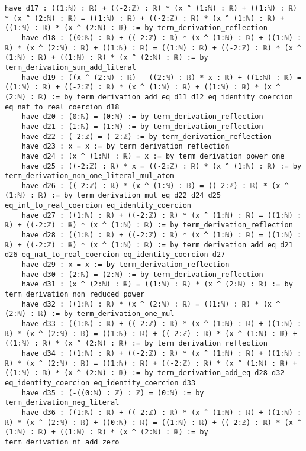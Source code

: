 \documentclass{article}
\begin{document}
\begin{tcolorbox}[colback=white!10, width=\linewidth]
\begin{lstlisting}[language=Lean4]
    have d17 : ((1:ℕ) : ℝ) + ((-2:ℤ) : ℝ) * (x ^ (1:ℕ) : ℝ) + ((1:ℕ) : ℝ) * (x ^ (2:ℕ) : ℝ) = ((1:ℕ) : ℝ) + ((-2:ℤ) : ℝ) * (x ^ (1:ℕ) : ℝ) + ((1:ℕ) : ℝ) * (x ^ (2:ℕ) : ℝ) := by term_derivation_reflection
    have d18 : ((0:ℕ) : ℝ) + ((-2:ℤ) : ℝ) * (x ^ (1:ℕ) : ℝ) + ((1:ℕ) : ℝ) * (x ^ (2:ℕ) : ℝ) + ((1:ℕ) : ℝ) = ((1:ℕ) : ℝ) + ((-2:ℤ) : ℝ) * (x ^ (1:ℕ) : ℝ) + ((1:ℕ) : ℝ) * (x ^ (2:ℕ) : ℝ) := by term_derivation_sum_add_literal
    have d19 : ((x ^ (2:ℕ) : ℝ) - ((2:ℕ) : ℝ) * x : ℝ) + ((1:ℕ) : ℝ) = ((1:ℕ) : ℝ) + ((-2:ℤ) : ℝ) * (x ^ (1:ℕ) : ℝ) + ((1:ℕ) : ℝ) * (x ^ (2:ℕ) : ℝ) := by term_derivation_add_eq d11 d12 eq_identity_coercion eq_nat_to_real_coercion d18
    have d20 : (0:ℕ) = (0:ℕ) := by term_derivation_reflection
    have d21 : (1:ℕ) = (1:ℕ) := by term_derivation_reflection
    have d22 : (-2:ℤ) = (-2:ℤ) := by term_derivation_reflection
    have d23 : x = x := by term_derivation_reflection
    have d24 : (x ^ (1:ℕ) : ℝ) = x := by term_derivation_power_one
    have d25 : ((-2:ℤ) : ℝ) * x = ((-2:ℤ) : ℝ) * (x ^ (1:ℕ) : ℝ) := by term_derivation_non_one_literal_mul_atom
    have d26 : ((-2:ℤ) : ℝ) * (x ^ (1:ℕ) : ℝ) = ((-2:ℤ) : ℝ) * (x ^ (1:ℕ) : ℝ) := by term_derivation_mul_eq d22 d24 d25 eq_int_to_real_coercion eq_identity_coercion
    have d27 : ((1:ℕ) : ℝ) + ((-2:ℤ) : ℝ) * (x ^ (1:ℕ) : ℝ) = ((1:ℕ) : ℝ) + ((-2:ℤ) : ℝ) * (x ^ (1:ℕ) : ℝ) := by term_derivation_reflection
    have d28 : ((1:ℕ) : ℝ) + ((-2:ℤ) : ℝ) * (x ^ (1:ℕ) : ℝ) = ((1:ℕ) : ℝ) + ((-2:ℤ) : ℝ) * (x ^ (1:ℕ) : ℝ) := by term_derivation_add_eq d21 d26 eq_nat_to_real_coercion eq_identity_coercion d27
    have d29 : x = x := by term_derivation_reflection
    have d30 : (2:ℕ) = (2:ℕ) := by term_derivation_reflection
    have d31 : (x ^ (2:ℕ) : ℝ) = ((1:ℕ) : ℝ) * (x ^ (2:ℕ) : ℝ) := by term_derivation_non_reduced_power
    have d32 : ((1:ℕ) : ℝ) * (x ^ (2:ℕ) : ℝ) = ((1:ℕ) : ℝ) * (x ^ (2:ℕ) : ℝ) := by term_derivation_one_mul
    have d33 : ((1:ℕ) : ℝ) + ((-2:ℤ) : ℝ) * (x ^ (1:ℕ) : ℝ) + ((1:ℕ) : ℝ) * (x ^ (2:ℕ) : ℝ) = ((1:ℕ) : ℝ) + ((-2:ℤ) : ℝ) * (x ^ (1:ℕ) : ℝ) + ((1:ℕ) : ℝ) * (x ^ (2:ℕ) : ℝ) := by term_derivation_reflection
    have d34 : ((1:ℕ) : ℝ) + ((-2:ℤ) : ℝ) * (x ^ (1:ℕ) : ℝ) + ((1:ℕ) : ℝ) * (x ^ (2:ℕ) : ℝ) = ((1:ℕ) : ℝ) + ((-2:ℤ) : ℝ) * (x ^ (1:ℕ) : ℝ) + ((1:ℕ) : ℝ) * (x ^ (2:ℕ) : ℝ) := by term_derivation_add_eq d28 d32 eq_identity_coercion eq_identity_coercion d33
    have d35 : (-((0:ℕ) : ℤ) : ℤ) = (0:ℕ) := by term_derivation_neg_literal
    have d36 : ((1:ℕ) : ℝ) + ((-2:ℤ) : ℝ) * (x ^ (1:ℕ) : ℝ) + ((1:ℕ) : ℝ) * (x ^ (2:ℕ) : ℝ) + ((0:ℕ) : ℝ) = ((1:ℕ) : ℝ) + ((-2:ℤ) : ℝ) * (x ^ (1:ℕ) : ℝ) + ((1:ℕ) : ℝ) * (x ^ (2:ℕ) : ℝ) := by term_derivation_nf_add_zero

\end{lstlisting}
\end{tcolorbox}
\end{document}
